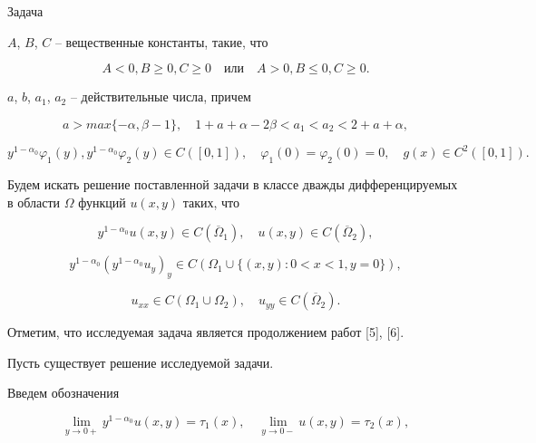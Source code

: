 \begin{newthm}{Задача}
{$A$, $B$, $C$ -- вещественные константы, такие, что

\[

A<0, B \geqslant 0, C \geqslant 0 \quad \text{или} \quad A>0, B \leqslant 0, C \geqslant 0.

\]

$a$, $b$, $a_{1}$, $a_{2}$ -- действительные числа, причем

\[

a> max \{-\alpha, \beta-1 \}, \quad 1+a+\alpha-2\beta< a_{1}< a_{2} <2+a+\alpha,

\]

\[

y^{1-\alpha_{0}} \varphi_{1}(y), y^{1-\alpha_{0}} \varphi_{2}(y) \in C([0,1] ), \quad \varphi_{1}(0) =\varphi_{2}(0)=0, \quad g(x) \in C^{2} ([0,1]).

\]

}

\end{newthm}



Будем искать решение поставленной задачи в классе дважды дифференцируемых в области $\Omega$ функций $u(x,y)$ таких, что

\[

y^{1-\alpha_{0}} u(x,y) \in C( \overline{\Omega}_{1}), \quad u(x,y) \in C( \overline{\Omega}_{2}),

\]

\[

y^{1-\alpha_{0}} \left( y^{1-\alpha_{0}}  u_{y} \right)_{y} \in C( \Omega_{1} \cup \{ (x,y): 0<x<1, y=0 \}),

\]

\[

u_{xx} \in C(\Omega_{1} \cup \Omega_{2}), \quad u_{yy} \in C( \overline{\Omega}_{2}).

\]



Отметим, что исследуемая задача является продолжением работ [5], [6].



\bigskip




Пусть существует решение исследуемой задачи.



Введем обозначения

\[

\lim_{y \to 0+} y^{1-\alpha_{0}} u(x,y) = \tau_{1}(x), \quad \lim_{y \to 0-} u(x,y)= \tau_{2}(x),

\]

